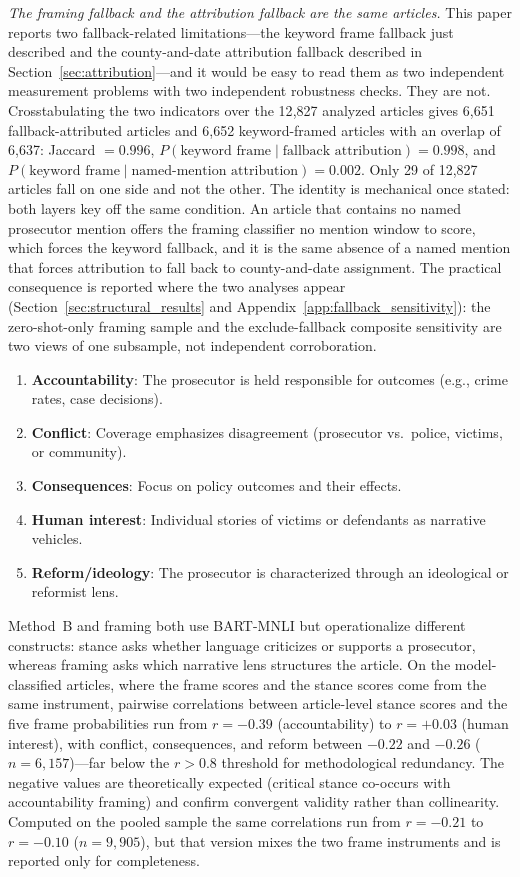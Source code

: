 \documentclass[12pt, letterpaper]{article}
\begin{document}
\emph{The framing fallback and the attribution fallback are the same articles.} This paper reports two fallback-related limitations---the keyword frame fallback just described and the county-and-date attribution fallback described in Section~\ref{sec:attribution}---and it would be easy to read them as two independent measurement problems with two independent robustness checks. They are not. Crosstabulating the two indicators over the 12{,}827 analyzed articles gives 6{,}651 fallback-attributed articles and 6{,}652 keyword-framed articles with an overlap of 6{,}637: Jaccard $= 0.996$, $P(\text{keyword frame} \mid \text{fallback attribution}) = 0.998$, and $P(\text{keyword frame} \mid \text{named-mention attribution}) = 0.002$. Only 29 of 12{,}827 articles fall on one side and not the other. The identity is mechanical once stated: both layers key off the same condition. An article that contains no named prosecutor mention offers the framing classifier no mention window to score, which forces the keyword fallback, and it is the same absence of a named mention that forces attribution to fall back to county-and-date assignment. The practical consequence is reported where the two analyses appear (Section~\ref{sec:structural_results} and Appendix~\ref{app:fallback_sensitivity}): the zero-shot-only framing sample and the exclude-fallback composite sensitivity are two views of one subsample, not independent corroboration.

\begin{enumerate}[nosep]
  \item \textbf{Accountability}: The prosecutor is held responsible for outcomes (e.g., crime rates, case decisions).
  \item \textbf{Conflict}: Coverage emphasizes disagreement (prosecutor vs.\ police, victims, or community).
  \item \textbf{Consequences}: Focus on policy outcomes and their effects.
  \item \textbf{Human interest}: Individual stories of victims or defendants as narrative vehicles.
  \item \textbf{Reform/ideology}: The prosecutor is characterized through an ideological or reformist lens.
\end{enumerate}

Method~B and framing both use BART-MNLI but operationalize different constructs: stance asks whether language criticizes or supports a prosecutor, whereas framing asks which narrative lens structures the article. On the model-classified articles, where the frame scores and the stance scores come from the same instrument, pairwise correlations between article-level stance scores and the five frame probabilities run from $r = -0.39$ (accountability) to $r = +0.03$ (human interest), with conflict, consequences, and reform between $-0.22$ and $-0.26$ ($n = 6{,}157$)---far below the $r > 0.8$ threshold for methodological redundancy. The negative values are theoretically expected (critical stance co-occurs with accountability framing) and confirm convergent validity rather than collinearity. Computed on the pooled sample the same correlations run from $r = -0.21$ to $r = -0.10$ ($n = 9{,}905$), but that version mixes the two frame instruments and is reported only for completeness.
\end{document}
